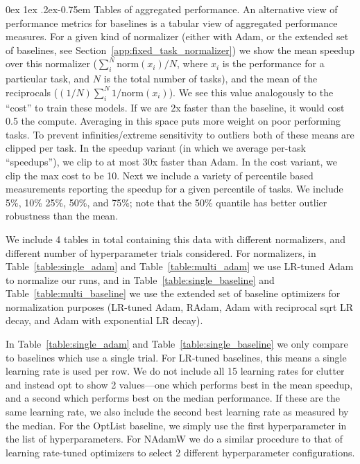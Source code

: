 \documentclass[11pt]{article}
\makeatletter
\renewcommand{\paragraph}{%
  \@startsection{paragraph}{4}%
  {\z@}{0ex \@plus 1ex \@minus .2ex}{-0.75em}%
  {\normalfont\normalsize\bfseries}%
}
\makeatother
\begin{document}
\paragraph{Tables of aggregated performance.}
An alternative view of performance metrics for baselines is a tabular view of aggregated performance measures. 
For a given kind of normalizer (either with Adam, or the extended set of baselines, see Section~\ref{app:fixed_task_normalizer}) we show the mean speedup over this normalizer ($\sum^N_i \text{norm}(x_i)/N$, where $x_i$ is the performance for a particular task, and $N$ is the total number of tasks), and the mean of the reciprocals ($(1/N)\sum^N_i 1/\text{norm}(x_i)$).
We see this value analogously to the ``cost'' to train these models. If we are 2x faster than the baseline, it would cost 0.5 the compute.
Averaging in this space puts more weight on poor performing tasks.
To prevent infinities/extreme sensitivity to outliers both of these means are clipped per task. In the speedup variant (in which we average per-task ``speedups''), we clip to at most 30x faster than Adam.
In the cost variant, we clip the max cost to be 10.
Next we include a variety of percentile based measurements reporting the speedup for a given percentile of tasks. We include 5\%, 10\% 25\%, 50\%, and 75\%; note that the 50\% quantile has better outlier robustness than the mean. 

We include 4 tables in total containing this data with different normalizers, and different number of hyperparameter trials considered.
For normalizers, in Table~\ref{table:single_adam} and Table~\ref{table:multi_adam} we use LR-tuned Adam to normalize our runs, and in Table~\ref{table:single_baseline} and Table~\ref{table:multi_baseline} we use the extended set of baseline optimizers for normalization purposes (LR-tuned Adam, RAdam, Adam with reciprocal sqrt LR decay, and Adam with exponential LR decay).

In Table~\ref{table:single_adam} and Table~\ref{table:single_baseline} we only compare to baselines which use a single trial.
For LR-tuned baselines, this means a single learning rate is used per row. We do not include all 15 learning rates for clutter and instead opt to show 2 values---one which performs best in the mean speedup, and a second which performs best on the median performance. If these are the same learning rate, we also include the second best learning rate as measured by the median. For the OptList baseline, we simply use the first hyperparameter in the list of hyperparameters. For NAdamW we do a similar procedure to that of learning rate-tuned optimizers to select 2 different hyperparameter configurations.
\end{document}
